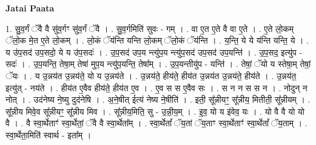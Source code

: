 \documentclass[17pt]{extarticle}
\begin{document}
\textbf{Jatai Paata} \newline

1. सु॒व॒र्गं ॅवै वै सु॑व॒र्गꣳ सु॑व॒र्गं ॅवै । . सु॒व॒र्गमिति॑ सुवः - गम् । . वा ए॒त ए॒ते वै वा ए॒ते । . ए॒ते लो॒कम् ॅलो॒क मे॒त ए॒ते लो॒कम् । . लो॒कं ॅय॑न्ति यन्ति लो॒कम् ॅलो॒कं ॅय॑न्ति । . य॒न्ति॒ ये ये य॑न्ति यन्ति॒ ये । . य उ॑प॒सद॑ उप॒सदो॒ ये य उ॑प॒सदः॑ । . उ॒प॒सद॑ उप॒य न्त्यु॑प॒य न्त्यु॑प॒सद॑ उप॒सद॑ उप॒यन्ति॑ । . उ॒प॒सद॒ इत्यु॑प - सदः॑ । . उ॒प॒यन्ति॒ तेषा॒म् तेषा॑ मुप॒य न्त्यु॑प॒यन्ति॒ तेषा᳚म् । . उ॒प॒यन्तीयु॑प - यन्ति॑ । . तेषां॒ ॅयो य स्तेषा॒म् तेषां॒ ॅयः । . य उ॒न्नय॑त उ॒न्नय॑ते॒ यो य उ॒न्नय॑ते । . उ॒न्नय॑ते॒ हीय॑ते॒ हीय॑त उ॒न्नय॑त उ॒न्नय॑ते॒ हीय॑ते । . उ॒न्नय॑त॒ इत्यु॑त् - नय॑ते । . हीय॑त ए॒वैव हीय॑ते॒ हीय॑त ए॒व । . ए॒व स स ए॒वैव सः । . स न न स स न । . नोदुन् न नोत् । . उद॑नेष्य ने॒ष्यु दुद॑नेषि । . अ॒ने॒षीत् ईत्य॑ नेष्य ने॒षीति॑ । . इती॒ सू᳚न्नीयꣳ॒॒ सू᳚न्नीय॒ मितीती॒ सू᳚न्नीयम् । . सू᳚न्नीय मिवे॒व सू᳚न्नीयꣳ॒॒ सू᳚न्नीय मिव । . सू᳚न्नीय॒मिति॒ सु - उ॒न्नी॒य॒म् । . इ॒व॒ यो य इ॑वेव॒ यः । . यो वै वै यो यो वै । . वै स्वा॒र्थेताꣳ॑ स्वा॒र्थेतां॒ ॅवै वै स्वा॒र्थेता᳚म् । . स्वा॒र्थेतां᳚ ॅय॒तां ॅय॒ताꣳ स्वा॒र्थेताꣳ॑ स्वा॒र्थेतां᳚ ॅय॒ताम् । . स्वा॒र्थेता॒मिति॑ स्वार्थ - इता᳚म् । \newline
\end{document}

